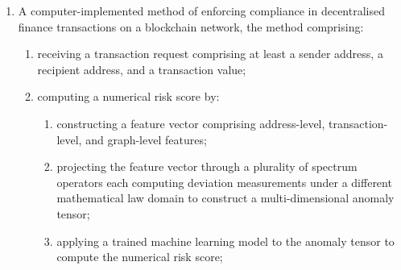 \documentclass[12pt,a4paper]{article}
\begin{document}
\begin{enumerate}[label=\textbf{\arabic*.}]
\begin{enumerate}[label=(\alph*)]
\item a deterministic policy engine configured to map the risk score to a
policy action according to the selected risk threshold profile and to
enforce the proof-requirement policy by causing a settlement-preventing
action when required proofs are absent, expired, or fail on-chain
verification, wherein the settlement-preventing action comprises at least
one of: causing a core smart contract function to revert execution of a
transaction call, or preventing release of value from an escrow smart
contract; and

\item smart contract infrastructure deployed on a blockchain network and
configured to implement, before settlement, the policy action determined by
the deterministic policy engine, including a core contract configured to
reject or authorise execution, an escrow contract configured to time-lock
value transfers for an escrow policy action, and a zero-knowledge proof
verifier contract configured to verify said cryptographic proofs,
wherein the core contract is further configured to require, for a
transaction class or threshold tier specified by the proof-requirement
policy, a successful verification result from the zero-knowledge proof
verifier contract prior to permitting execution;
\end{enumerate}

\noindent wherein the smart contract infrastructure prevents settlement of
the transaction request unless the policy action permits execution and, when
required by the proof-requirement policy, the cryptographic proofs are
verified on-chain.

\item A computer-implemented method of enforcing compliance in decentralised
finance transactions on a blockchain network, the method comprising:
\begin{enumerate}[label=(\alph*)]

\item receiving a transaction request comprising at least a sender address,
a recipient address, and a transaction value;

\item computing a numerical risk score by:
\begin{enumerate}[label=(\roman*)]
  \item constructing a feature vector comprising address-level,
  transaction-level, and graph-level features;
  \item projecting the feature vector through a plurality of spectrum
  operators each computing deviation measurements under a different
  mathematical law domain to construct a multi-dimensional anomaly tensor;
  \item applying a trained machine learning model to the anomaly tensor to
  compute the numerical risk score;
\end{enumerate}


\end{enumerate}
\end{enumerate}
\end{document}
